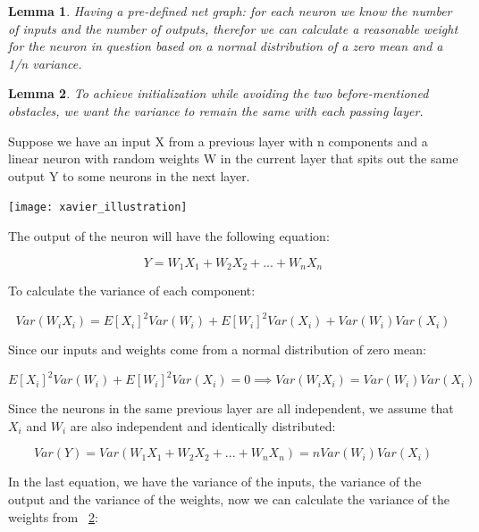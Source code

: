 \documentclass[12pt]{article}
\newtheorem{lemma}{Lemma}
\begin{document}
\begin{lemma}\label{lemma1}
Having a pre-defined net graph: for each neuron we know the number of inputs and the number of outputs, therefor we can calculate a reasonable weight for the neuron in question based on a normal distribution of a zero mean and a 1/n variance.
\end{lemma}
\begin{lemma}\label{lemma2}
To achieve initialization while avoiding the two before-mentioned obstacles, we want the variance to remain the same with each passing layer.	
\end{lemma}
\newpage
Suppose we have an input X from a previous layer with n components and a linear neuron with random weights W in the current layer that spits out the same output Y to some neurons in the next layer.
\begin{center}
	\texttt{[image: xavier\_illustration]}
\end{center}
The output of the neuron will have the following equation:
\begin{center}
	\begin{equation}
		Y = W_1X_1 + W_2X_2 + ... + W_n X_n \label{eq:1}
	\end{equation}
\end{center}
To calculate the variance of each component:
\begin{center}
	\begin{equation}
		Var(W_iX_i) = E[X_i]^2 Var(W_i) + E[W_i]^2 Var(X_i) + Var(W_i)Var(X_i) \label{eq:2}
	\end{equation}
\end{center}
Since our inputs and weights come from a normal distribution of zero mean:
\begin{center}
	\begin{equation}
		E[X_i]^2 Var(W_i) + E[W_i]^2 Var(X_i) = 0 \implies
		Var(W_iX_i) = Var(W_i)Var(X_i) \label{eq:3}
	\end{equation}
\end{center}
Since the neurons in the same previous layer are all independent, we assume that $ X_i $ and $ W_i $  are also independent and identically distributed:
\begin{center}
	\begin{equation}
	 Var(Y) = Var(W_1X_1 + W_2X_2 + ... + W_n X_n) = nVar(W_i)Var(X_i) \label{eq:4}
	\end{equation}
\end{center}
In the last equation, we have the variance of the inputs, the variance of the output and the variance of the weights, now we can calculate the variance of the weights from ~\cref{lemma2}:
\end{document}

